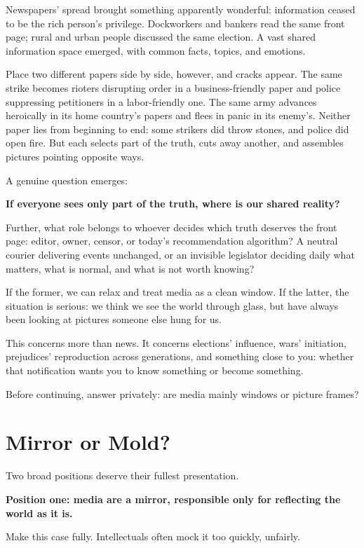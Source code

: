 Newspapers' spread brought something apparently wonderful: information ceased to be the rich person's privilege. Dockworkers and bankers read the same front page; rural and urban people discussed the same election. A vast shared information space emerged, with common facts, topics, and emotions.

Place two different papers side by side, however, and cracks appear. The same strike becomes rioters disrupting order in a business-friendly paper and police suppressing petitioners in a labor-friendly one. The same army advances heroically in its home country's papers and flees in panic in its enemy's. Neither paper lies from beginning to end: some strikers did throw stones, and police did open fire. But each selects part of the truth, cuts away another, and assembles pictures pointing opposite ways.

A genuine question emerges:

\textbf{If everyone sees only part of the truth, where is our shared reality?}

Further, what role belongs to whoever decides which truth deserves the front page: editor, owner, censor, or today's recommendation algorithm? A neutral courier delivering events unchanged, or an invisible legislator deciding daily what matters, what is normal, and what is not worth knowing?

If the former, we can relax and treat media as a clean window. If the latter, the situation is serious: we think we see the world through glass, but have always been looking at pictures someone else hung for us.

This concerns more than news. It concerns elections' influence, wars' initiation, prejudices' reproduction across generations, and something close to you: whether that notification wants you to know something or become something.

Before continuing, answer privately: are media mainly windows or picture frames?

\section{Mirror or Mold?}
Two broad positions deserve their fullest presentation.

\textbf{Position one: media are a mirror, responsible only for reflecting the world as it is.}

Make this case fully. Intellectuals often mock it too quickly, unfairly.


